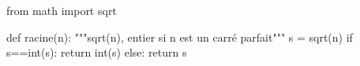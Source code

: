 \question{} 
\begin{pyverbatim}
from math import sqrt 

def racine(n):
    """sqrt(n), entier si n est un carré parfait"""
    s = sqrt(n)
    if s==int(s):
        return int(s)
    else:
        return s
\end{pyverbatim}


